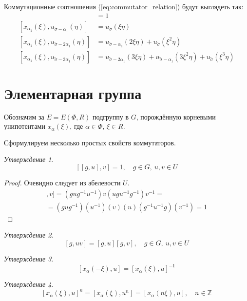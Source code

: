 \documentclass[10pt]{article}
\theoremstyle{remark}
\newtheorem{prop}{Утверждение}
\newcommand{\Z}{\mathbb{Z}}
\begin{document}
Коммутационные соотношения (\ref{eq:commutator_relation}) будут выглядеть так:
\begin{align*}
[x_{\alpha_1}(\xi), u_{\widetilde\sigma}(\eta)] & = 1\\
[x_{\alpha_1}(\xi), u_{\widetilde\sigma-\alpha_1}(\eta)] & = u_{\widetilde\sigma}(\xi\eta)\\
[x_{\alpha_1}(\xi), u_{\widetilde\sigma-2\alpha_1}(\eta)] & = u_{\widetilde\sigma-\alpha_1}(2\xi\eta)+u_{\widetilde\sigma}(\xi^2\eta)\\
[x_{\alpha_1}(\xi), u_{\widetilde\sigma-3\alpha_1}(\eta)] & = u_{\widetilde\sigma-2\alpha_1}(3\xi\eta)+u_{\widetilde\sigma-\alpha_1}(3\xi^2\eta)+u_{\widetilde\sigma}(\xi^3\eta)
\end{align*}

\section{Элементарная группа}

Обозначим за $E = E(\Phi,R)$ подгруппу в $G$, порождённую корневыми унипотентами $x_\alpha(\xi)$, где $\alpha \in \Phi$, $\xi \in R$.

Сформулируем несколько простых свойств коммутаторов.

\begin{prop}
  $$[[g,u],v] = 1, \quad g \in G, \ u,v \in U $$
\end{prop}
\begin{proof}
  Очевидно следует из абелевости $U$.
\begin{align*}
[[g,u],v] = (g u g^{-1} u^{-1}) v (u g u^{-1} g^{-1}) v^{-1} = \\
= (gug^{-1}) (u^{-1}) (v) (u) (g^{-1}u^{-1}g) (v^{-1}) = 1
\end{align*}
\end{proof}

\begin{prop}
  $$[g,uv] = [g,u][g,v], \quad g \in G, \ u,v \in U $$
\end{prop}

\begin{prop}
  $$[x_\alpha(-\xi),u] = [x_\alpha(\xi),u]^{-1}$$
\end{prop}
  


\begin{prop}
  $$[x_\alpha(\xi),u]^n = [x_\alpha(\xi),u^n] = [x_\alpha(n\xi),u], \quad n \in \Z$$
\end{prop}
\end{document}
